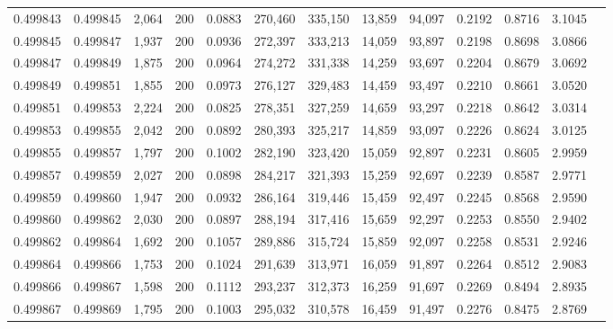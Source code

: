 \begin{tabular}{rrrrrrrrrrrrr}
0.499843 & 0.499845 &  2,064 & 200 &                                     0.0883 & 270,460 & 335,150 &  13,859 &  94,097 & 0.2192 & 0.8716 & 3.1045 \\
0.499845 & 0.499847 &  1,937 & 200 &                                     0.0936 & 272,397 & 333,213 &  14,059 &  93,897 & 0.2198 & 0.8698 & 3.0866 \\
0.499847 & 0.499849 &  1,875 & 200 &                                     0.0964 & 274,272 & 331,338 &  14,259 &  93,697 & 0.2204 & 0.8679 & 3.0692 \\
0.499849 & 0.499851 &  1,855 & 200 &                                     0.0973 & 276,127 & 329,483 &  14,459 &  93,497 & 0.2210 & 0.8661 & 3.0520 \\
0.499851 & 0.499853 &  2,224 & 200 &                                     0.0825 & 278,351 & 327,259 &  14,659 &  93,297 & 0.2218 & 0.8642 & 3.0314 \\
0.499853 & 0.499855 &  2,042 & 200 &                                     0.0892 & 280,393 & 325,217 &  14,859 &  93,097 & 0.2226 & 0.8624 & 3.0125 \\
0.499855 & 0.499857 &  1,797 & 200 &                                     0.1002 & 282,190 & 323,420 &  15,059 &  92,897 & 0.2231 & 0.8605 & 2.9959 \\
0.499857 & 0.499859 &  2,027 & 200 &                                     0.0898 & 284,217 & 321,393 &  15,259 &  92,697 & 0.2239 & 0.8587 & 2.9771 \\
0.499859 & 0.499860 &  1,947 & 200 &                                     0.0932 & 286,164 & 319,446 &  15,459 &  92,497 & 0.2245 & 0.8568 & 2.9590 \\
0.499860 & 0.499862 &  2,030 & 200 &                                     0.0897 & 288,194 & 317,416 &  15,659 &  92,297 & 0.2253 & 0.8550 & 2.9402 \\
0.499862 & 0.499864 &  1,692 & 200 &                                     0.1057 & 289,886 & 315,724 &  15,859 &  92,097 & 0.2258 & 0.8531 & 2.9246 \\
0.499864 & 0.499866 &  1,753 & 200 &                                     0.1024 & 291,639 & 313,971 &  16,059 &  91,897 & 0.2264 & 0.8512 & 2.9083 \\
0.499866 & 0.499867 &  1,598 & 200 &                                     0.1112 & 293,237 & 312,373 &  16,259 &  91,697 & 0.2269 & 0.8494 & 2.8935 \\
0.499867 & 0.499869 &  1,795 & 200 &                                     0.1003 & 295,032 & 310,578 &  16,459 &  91,497 & 0.2276 & 0.8475 & 2.8769 \\

\end{tabular}
